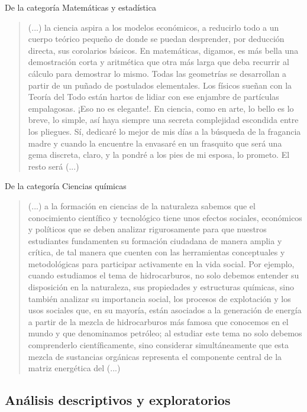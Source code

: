 \documentclass[11pt,a4paper]{article}
\begin{document}
	De la categoría Matemáticas y estadística
	
	\begin{quote}
		(...) la ciencia aspira a los modelos económicos, a reducirlo todo a un cuerpo teórico pequeño de donde se puedan desprender, por deducción directa, sus corolarios básicos. En matemáticas, digamos, es más bella una demostración corta y aritmética que otra más larga que deba recurrir al cálculo para demostrar lo mismo. Todas las geometrías se desarrollan a partir de un puñado de postulados elementales. Los físicos sueñan con la Teoría del Todo están hartos de lidiar con ese enjambre de partículas empalagosas. ¡Eso no es elegante!. En ciencia, como en arte, lo bello es lo breve, lo simple, así haya siempre una secreta complejidad escondida entre los pliegues. Sí, dedicaré lo mejor de mis días a la búsqueda de la fragancia madre y cuando la encuentre la envasaré en un frasquito que será una gema discreta, claro, y la pondré a los pies de mi esposa, lo prometo. El resto será (...)
	\end{quote}
	
	De la categoría Ciencias químicas
	
	\begin{quote}
		(...) a la formación en ciencias de la naturaleza sabemos que el conocimiento científico y tecnológico tiene unos efectos sociales, económicos y políticos que se deben analizar rigurosamente para que nuestros estudiantes fundamenten su formación ciudadana de manera amplia y crítica, de tal manera que cuenten con las herramientas conceptuales y metodológicas para participar activamente en la vida social. Por ejemplo, cuando estudiamos el tema de hidrocarburos, no solo debemos entender su disposición en la naturaleza, sus propiedades y estructuras químicas, sino también analizar su importancia social, los procesos de explotación y los usos sociales que, en su mayoría, están asociados a la generación de energía a partir de la mezcla de hidrocarburos más famosa que conocemos en el mundo y que denominamos petróleo; al estudiar este tema no solo debemos comprenderlo científicamente, sino considerar simultáneamente que esta mezcla de sustancias orgánicas representa el componente central de la matriz energética del (...)
	\end{quote}
	
	
	
	\subsection{Análisis descriptivos y exploratorios}
	
\end{document}
